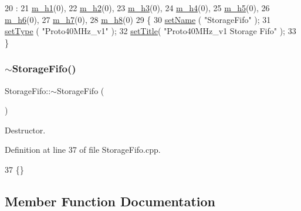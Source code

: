 \begin{DoxyCode}
20                            :
21   \hyperlink{classStorageFifo_abe762844e442bc8188643b18b276d801}{m\_h1}(0),
22   \hyperlink{classStorageFifo_a3caf6211541aaa4be8e60c03d79bf253}{m\_h2}(0),
23   \hyperlink{classStorageFifo_a7e6b54c96a9b53a9917f7f21bda12b2e}{m\_h3}(0),
24   \hyperlink{classStorageFifo_ad026ffc1c7590bb3563538490be9aa00}{m\_h4}(0),
25   \hyperlink{classStorageFifo_ae9133c5421f9fa166b837933706d2a59}{m\_h5}(0),
26   \hyperlink{classStorageFifo_a39ca376b2a74643c54e4df2dfabf0906}{m\_h6}(0),
27   \hyperlink{classStorageFifo_a01784ff4138a1b32eb517931b5866cc6}{m\_h7}(0),
28   \hyperlink{classStorageFifo_aeef4b7183e14d05bab673d948d85b84c}{m\_h8}(0)
29 \{
30   \hyperlink{classObject_ae30fea75683c2d149b6b6d17c09ecd0c}{setName} ( \textcolor{stringliteral}{"StorageFifo"} );
31   \hyperlink{classObject_aae534cc9d982bcb9b99fd505f2e103a5}{setType} ( \textcolor{stringliteral}{"Proto40MHz\_v1"} );
32   \hyperlink{classObject_a89557dbbad5bcaa02652f5d7fa35d20f}{setTitle}( \textcolor{stringliteral}{"Proto40MHz\_v1 Storage Fifo"} );
33 \}
\end{DoxyCode}
\mbox{\label{classStorageFifo_a5c464d5913f8857b54462f982bfa8ea3}} 
\subsubsection{\texorpdfstring{$\sim$\+Storage\+Fifo()}{~StorageFifo()}}
{\footnotesize\ttfamily Storage\+Fifo\+::$\sim$\+Storage\+Fifo (\begin{DoxyParamCaption}{ }\end{DoxyParamCaption})\hspace{0.3cm}{\ttfamily [virtual]}}



Destructor. 



Definition at line 37 of file Storage\+Fifo.\+cpp.


\begin{DoxyCode}
37 \{\} 
\end{DoxyCode}


\subsection{Member Function Documentation}
\mbox{\label{classStorageFifo_a80b534eb6d81a3b570f6957d6a932987}} 
